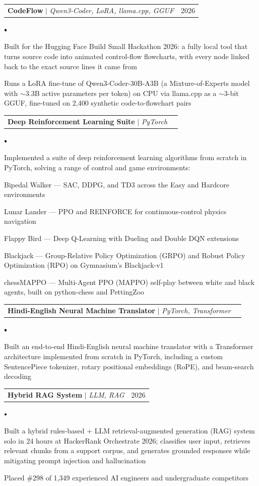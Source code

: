 \documentclass[letterpaper,11pt]{article}
\makeatletter
\newcommand{\resumeItem}[1]{
  \item\small{
    {#1}
  }
}
\newcommand{\resumeProjectHeading}[2]{
    \vspace{2pt}\item
    \begin{tabular*}{0.97\textwidth}{l@{\extracolsep{\fill}}r}
      \small#1 & #2 \\
    \end{tabular*}\vspace{1pt}
}
\newcommand{\resumeItemListStart}{%
  \begin{list}{$\vcenter{\hbox{\scriptsize$\bullet$}}$}{%
    \setlength{\leftmargin}{0.3in}%
    \setlength{\labelwidth}{0.15in}%
    \setlength{\labelsep}{0.1in}%
    \setlength{\itemsep}{2pt}%
    \setlength{\parsep}{0pt}%
    \setlength{\topsep}{3pt}%
    \setlength{\itemindent}{0pt}}}
\newcommand{\resumeItemListEnd}{\end{list}\vspace{1pt}}
\makeatother
\begin{document}
    \resumeProjectHeading
      {\textbf{CodeFlow} $|$ \emph{Qwen3-Coder, LoRA, llama.cpp, GGUF}}{2026}
      \resumeItemListStart
        \resumeItem{Built for the Hugging Face Build Small Hackathon 2026: a fully local tool that turns source code into animated control-flow flowcharts, with every node linked back to the exact source lines it came from}
        \resumeItem{Runs a LoRA fine-tune of Qwen3-Coder-30B-A3B (a Mixture-of-Experts model with $\sim$3.3B active parameters per token) on CPU via llama.cpp as a $\sim$3-bit GGUF, fine-tuned on 2,400 synthetic code-to-flowchart pairs}
      \resumeItemListEnd

    \resumeProjectHeading
      {\textbf{Deep Reinforcement Learning Suite} $|$ \emph{PyTorch}}{}
      \resumeItemListStart
        \resumeItem{Implemented a suite of deep reinforcement learning algorithms from scratch in PyTorch, solving a range of control and game environments:}
        \resumeItem{Bipedal Walker --- SAC, DDPG, and TD3 across the Easy and Hardcore environments}
        \resumeItem{Lunar Lander --- PPO and REINFORCE for continuous-control physics navigation}
        \resumeItem{Flappy Bird --- Deep Q-Learning with Dueling and Double DQN extensions}
        \resumeItem{Blackjack --- Group-Relative Policy Optimization (GRPO) and Robust Policy Optimization (RPO) on Gymnasium's Blackjack-v1}
        \resumeItem{chessMAPPO --- Multi-Agent PPO (MAPPO) self-play between white and black agents, built on python-chess and PettingZoo}
      \resumeItemListEnd

    \resumeProjectHeading
      {\textbf{Hindi-English Neural Machine Translator} $|$ \emph{PyTorch, Transformer}}{}
      \resumeItemListStart
        \resumeItem{Built an end-to-end Hindi-English neural machine translator with a Transformer architecture implemented from scratch in PyTorch, including a custom SentencePiece tokenizer, rotary positional embeddings (RoPE), and beam-search decoding}
      \resumeItemListEnd

    \resumeProjectHeading
      {\textbf{Hybrid RAG System} $|$ \emph{LLM, RAG}}{2026}
      \resumeItemListStart
        \resumeItem{Built a hybrid rules-based + LLM retrieval-augmented generation (RAG) system solo in 24 hours at HackerRank Orchestrate 2026; classifies user input, retrieves relevant chunks from a support corpus, and generates grounded responses while mitigating prompt injection and hallucination}
        \resumeItem{Placed \#298 of 1,349 experienced AI engineers and undergraduate competitors}
      \resumeItemListEnd
\end{document}
